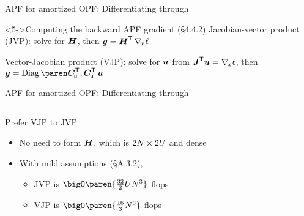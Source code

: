 \begin{frame}[t]{APF for amortized OPF: Differentiating through \APFE}{}
\begin{overlayarea}{\textwidth}{\textheight}
    \begin{block}<5->{Computing the backward APF gradient (\S 4.4.2)}
        \textcolor{CornellRed}{Jacobian-vector product} (JVP):
        solve for \(\APFJac[b]\),
        then \(\APFBGrad = \APFJac[b]^{\mathsf{T}} \, \nabla_{\!\PFEVars}\ell\)

        \textcolor{CornellRed}{Vector-Jacobian product} (VJP):
        solve for \(\RealVec{u}\) from
        \(\APFJac^{\mathsf{T}} \RealVec{u} = \nabla_{\!\PFEVars}\ell\),
        then \(\APFBGrad = \Diag{\SupCon^{\mathsf{T}},\SupCon^{\mathsf{T}}} \, \RealVec{u}\)
    \end{block}
    \end{overlayarea}
\end{frame}

\begin{frame}[t]{APF for amortized OPF: Differentiating through \APFE}{}
    \begin{columns}[T]
    \begin{column}{0.4\textwidth}
    Prefer VJP to JVP
    \begin{itemize}
        \item <5-> No need to form \(\APFJac[b]\),
            which is \textcolor<5>{CornellRed}{\(2N \times 2U\) and dense}

        \item <6-> With mild assumptions (\S A.3.2),
        \begin{itemize}
            \item <6-> JVP is \textcolor<6>{CornellRed}{
                \(\bigO\paren{\tfrac{32}{2}\NumSupUnits\NumBuses^{3}}\) flops}
            \item <6-> VJP is \textcolor<6>{CornellRed}{
                \(\bigO\paren{\tfrac{16}{3}\NumBuses^{3}}\) flops}
        \end{itemize}
    \end{itemize}
    \end{column}


\end{columns}
\end{frame}
